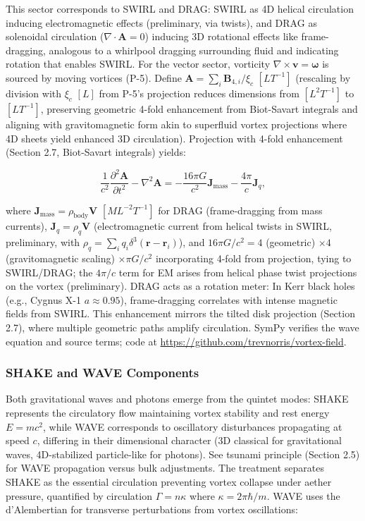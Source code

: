 This sector corresponds to SWIRL and DRAG: SWIRL as 4D helical circulation inducing electromagnetic effects (preliminary, via twists), and DRAG as solenoidal circulation ($\nabla \cdot \mathbf{A} = 0$) inducing 3D rotational effects like frame-dragging, analogous to a whirlpool dragging surrounding fluid and indicating rotation that enables SWIRL. For the vector sector, vorticity $\nabla \times \mathbf{v} = \boldsymbol{\omega}$ is sourced by moving vortices (P-5). Define $\mathbf{A} = \sum_i \mathbf{B}_{4,i} / \xi_c$ $[L T^{-1}]$ (rescaling by division with $\xi_c$ $[L]$ from P-5's projection reduces dimensions from $[L^2 T^{-1}]$ to $[L T^{-1}]$, preserving geometric 4-fold enhancement from Biot-Savart integrals and aligning with gravitomagnetic form akin to superfluid vortex projections where 4D sheets yield enhanced 3D circulation). Projection with 4-fold enhancement (Section 2.7, Biot-Savart integrals) yields:

\begin{equation}
\frac{1}{c^2} \frac{\partial^2 \mathbf{A}}{\partial t^2} - \nabla^2 \mathbf{A} = -\frac{16\pi G}{c^2} \mathbf{J}_{\text{mass}} - \frac{4\pi}{c} \mathbf{J}_q,
\end{equation}

where $\mathbf{J}_{\text{mass}} = \rho_{\text{body}} \mathbf{V}$ $[M L^{-2} T^{-1}]$ for DRAG (frame-dragging from mass currents), $\mathbf{J}_q = \rho_q \mathbf{V}$ (electromagnetic current from helical twists in SWIRL, preliminary, with $\rho_q = \sum_i q_i \delta^3(\mathbf{r} - \mathbf{r}_i)$), and $16\pi G/c^2 = 4$ (geometric) $\times 4$ (gravitomagnetic scaling) $\times \pi G/c^2$ incorporating 4-fold from projection, tying to SWIRL/DRAG; the $4\pi/c$ term for EM arises from helical phase twist projections on the vortex (preliminary). DRAG acts as a rotation meter: In Kerr black holes (e.g., Cygnus X-1 $a\approx0.95$), frame-dragging correlates with intense magnetic fields from SWIRL. This enhancement mirrors the tilted disk projection (Section 2.7), where multiple geometric paths amplify circulation. SymPy verifies the wave equation and source terms; code at \url{https://github.com/trevnorris/vortex-field}.

\subsubsection{SHAKE and WAVE Components}

Both gravitational waves and photons emerge from the quintet modes: SHAKE represents the circulatory flow maintaining vortex stability and rest energy $E = m c^2$, while WAVE corresponds to oscillatory disturbances propagating at speed $c$, differing in their dimensional character (3D classical for gravitational waves, 4D-stabilized particle-like for photons). See tsunami principle (Section 2.5) for WAVE propagation versus bulk adjustments. The treatment separates SHAKE as the essential circulation preventing vortex collapse under aether pressure, quantified by circulation $\Gamma = n \kappa$ where $\kappa = 2 \pi \hbar / m$. WAVE uses the d'Alembertian for transverse perturbations from vortex oscillations:

